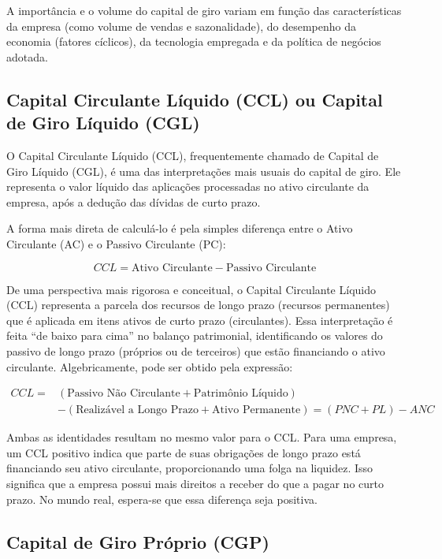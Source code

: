 \documentclass[
  a4paper,
]{book}
\begin{document}
A importância e o volume do capital de giro variam em função das
características da empresa (como volume de vendas e sazonalidade), do
desempenho da economia (fatores cíclicos), da tecnologia empregada e da
política de negócios adotada.

\subsection{Capital Circulante Líquido (CCL) ou Capital de Giro Líquido
(CGL)}\label{capital-circulante-luxedquido-ccl-ou-capital-de-giro-luxedquido-cgl}

O Capital Circulante Líquido (CCL), frequentemente chamado de Capital de
Giro Líquido (CGL), é uma das interpretações mais usuais do capital de
giro. Ele representa o valor líquido das aplicações processadas no ativo
circulante da empresa, após a dedução das dívidas de curto prazo.

A forma mais direta de calculá-lo é pela simples diferença entre o Ativo
Circulante (AC) e o Passivo Circulante (PC):

\[CCL = \text{Ativo Circulante} - \text{Passivo Circulante}\]

De uma perspectiva mais rigorosa e conceitual, o Capital Circulante
Líquido (CCL) representa a parcela dos recursos de longo prazo (recursos
permanentes) que é aplicada em itens ativos de curto prazo
(circulantes). Essa interpretação é feita ``de baixo para cima'' no
balanço patrimonial, identificando os valores do passivo de longo prazo
(próprios ou de terceiros) que estão financiando o ativo circulante.
Algebricamente, pode ser obtido pela expressão:

\[
\begin{split}
CCL = & (\text{Passivo Não Circulante} + \text{Patrimônio Líquido}) \\
      & - (\text{Realizável a Longo Prazo} + \text{Ativo Permanente}) = (PNC + PL) - ANC
\end{split}
\]

Ambas as identidades resultam no mesmo valor para o CCL. Para uma
empresa, um CCL positivo indica que parte de suas obrigações de longo
prazo está financiando seu ativo circulante, proporcionando uma folga na
liquidez. Isso significa que a empresa possui mais direitos a receber do
que a pagar no curto prazo. No mundo real, espera-se que essa diferença
seja positiva.

\subsection{Capital de Giro Próprio
(CGP)}\label{capital-de-giro-pruxf3prio-cgp}
\end{document}
